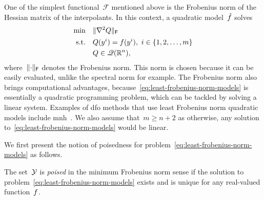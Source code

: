 One of the simplest functional~$\mathcal{F}$ mentioned above is the Frobenius norm of the Hessian matrix of the interpolants.
In this context, a quadratic model~$\objm$ solves
\begin{subequations}
    \label{eq:least-frobenius-norm-models}
    \begin{align}
        \min        & \quad \lVert\nabla^2 Q\rVert_{\mathsf{F}}\\
        \text{s.t.} & \quad Q(y^i) = f(y^i), ~ i \in \{1, 2, \dots, m\} \label{eq:least-frobenius-norm-models-eq}\\
                    & \quad Q \in \mathscr{Q}(\mathbb{R}^n), \nonumber
    \end{align}
\end{subequations}
where~$\lVert\cdot\rVert_{\mathsf{F}}$ denotes the Frobenius norm.
This norm is chosen because it can be easily evaluated, unlike the spectral norm for example.
The Frobenius norm also brings computational advantages, because~\cref{eq:least-frobenius-norm-models} is essentially a quadratic programming problem, which can be tackled by solving a linear system.
Examples of \gls{dfo} methods that use least Frobenius norm quadratic models include \gls{mnh}~\cite{Wild_2008}.
We also assume that~$m \ge n + 2$ as otherwise, any solution to~\cref{eq:least-frobenius-norm-models} would be linear.

We first present the notion of poisedness for problem~\cref{eq:least-frobenius-norm-models} as follows.

\begin{definition}[Poisedness]
    \label{def:poisedness}
    The set~$\xpt$ is \emph{poised} in the minimum Frobenius norm sense if the solution to problem~\cref{eq:least-frobenius-norm-models} exists and is unique for any real-valued function~$f$.
\end{definition}




